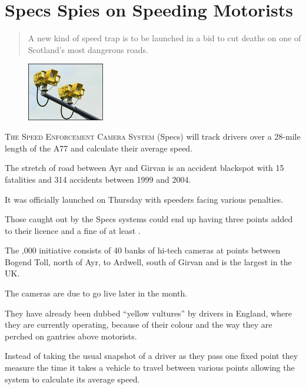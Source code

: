 \documentclass[11pt]{article}
\begin{document}
\drawtitle

\section*{Specs Spies on Speeding Motorists}

\begin{abstract}
  \noindent A new kind of speed trap is to be launched in a bid to cut
  deaths on one of Scotland's most dangerous roads.
\end{abstract}

\begin{figure}
  \begin{center}
    \includegraphics[width=0.3\textwidth]{camera.jpg}
  \end{center}
\end{figure}

\lettrine[lines=1]{T}{he Speed Enforcement Camera System} (Specs) will
track drivers over a 28-mile length of the A77 and calculate their
average speed.

The stretch of road between Ayr and Girvan is an accident blackspot
with 15 fatalities and 314 accidents between 1999 and 2004.

It was officially launched on Thursday with speeders facing various
penalties.

Those caught out by the Specs systems could end up having three points
added to their licence and a fine of at least .

The ,000 initiative consists of 40 banks of hi-tech
cameras at points between Bogend Toll, north of Ayr, to Ardwell, south
of Girvan and is the largest in the UK.

The cameras are due to go live later in the month.

They have already been dubbed ``yellow vultures'' by drivers in England,
where they are currently operating, because of their colour and the
way they are perched on gantries above motorists.

Instead of taking the usual snapshot of a driver as they pass one
fixed point they measure the time it takes a vehicle to travel between
various points allowing the system to calculate its average speed.
\end{document}
